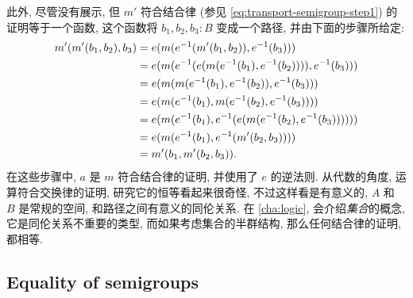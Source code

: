 此外, 尽管没有展示, 但 $m'$ 符合结合律
(参见 \eqref{eq:transport-semigroup-step1})
的证明等于一个函数, 这个函数将 $b_1,b_2,b_3 : B$ 变成一个路径, 并由下面的步骤所给定:
\begin{equation}
    \label{eq:transport-semigroup-assoc}
    \begin{aligned}
        m'(m'(b_1,b_2),b_3)
        &= e(m(\opp{e}(m'(b_1,b_2)),\opp{e}(b_3))) \\
        &= e(m(\opp{e}(e(m(\opp{e}(b_1),\opp{e}(b_2)))),\opp{e}(b_3))) \\
        &= e(m(m(\opp{e}(b_1),\opp{e}(b_2)),\opp{e}(b_3))) \\
        &= e(m(\opp{e}(b_1),m(\opp{e}(b_2),\opp{e}(b_3)))) \\
        &= e(m(\opp{e}(b_1),\opp{e}(e(m(\opp{e}(b_2),\opp{e}(b_3)))))) \\
        &= e(m(\opp{e}(b_1),\opp{e}(m'(b_2,b_3)))) \\
        &= m'(b_1,m'(b_2,b_3)).
    \end{aligned}
\end{equation}
在这些步骤中, $a$ 是 $m$ 符合结合律的证明, 并使用了 $e$ 的逆法则.
从代数的角度, 运算符合交换律的证明, 研究它的恒等看起来很奇怪,
不过这样看是有意义的, $A$ 和 $B$ 是常规的空间, 和路径之间有意义的同伦关系.
在 \cref{cha:logic}, 会介绍\emph{集合}的概念, 它是同伦关系不重要的类型,
而如果考虑集合的半群结构, 那么任何结合律的证明, 都相等.

\subsection{Equality of semigroups}
\label{sec:equality-semigroups}

